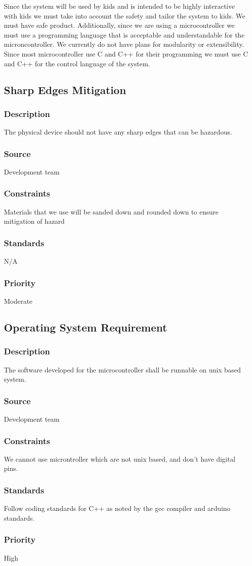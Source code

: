 Since the system will be used by kids and is intended to be highly interactive with kids we must take into account the safety and tailor the system to kids. We must have safe product. Additionally, since we are using a microcontroller we must use a programming language that is acceptable and understandable for the microncontroller. We currently do not have plans for modularity or extensibility. Since most microcontroller use C and C++ for their programming we must use C and C++ for the control language of the system.

\subsection{Sharp Edges Mitigation}
\subsubsection{Description}
The physical device should not have any sharp edges that can be hazardous.
\subsubsection{Source}
Development team
\subsubsection{Constraints}
Materials that we use will be sanded down and rounded down to ensure mitigation of hazard
\subsubsection{Standards}
N/A
\subsubsection{Priority}
Moderate

\subsection{Operating System Requirement}
\subsubsection{Description}
The software developed for the microcontroller shall be runnable on unix based system.
\subsubsection{Source}
Development team
\subsubsection{Constraints}
We cannot use microntroller which are not unix based, and don't have digital pins.
\subsubsection{Standards}
Follow coding standards for C++ as noted by the gcc compiler and arduino standards.
\subsubsection{Priority}
High